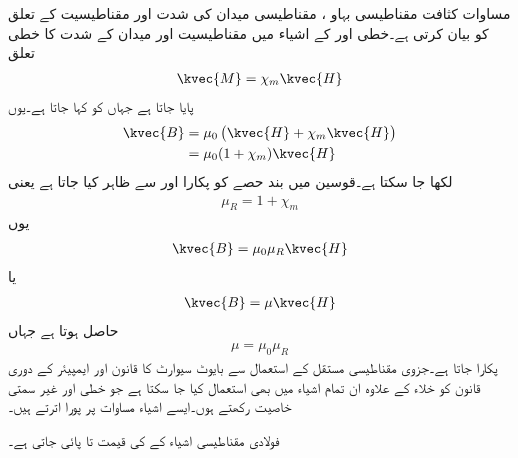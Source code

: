 مساوات  کثافت مقناطیسی  بہاو ، مقناطیسی میدان کی شدت  اور مقناطیسیت  کے تعلق کو بیان کرتی ہے۔خطی اور  کے اشیاء  میں مقناطیسیت اور میدان کے شدت کا خطی تعلق
\begin{align}\label{مساوات_امالہ_خطی_ہم_سمتی_اشیاء_تعلق}
\kvec{M}=\chi_m \kvec{H}
\end{align}
پایا جاتا ہے  جہاں  کو  کہا جاتا ہے۔یوں
\begin{align*}
\kvec{B}&=\mu_0\left(\kvec{H}+\chi_m \kvec{H} \right)\\
&=\mu_0 (1+\chi_m)\kvec{H}
\end{align*}
لکھا جا سکتا ہے۔قوسین میں بند حصے کو  پکارا اور  سے ظاہر کیا جاتا ہے یعنی
\begin{align}
\mu_R=1+\chi_m
\end{align}
یوں
\begin{align*}
\kvec{B}=\mu_0 \mu_R \kvec{H}
\end{align*}
یا
\begin{align}
\kvec{B}=\mu \kvec{H}
\end{align}
حاصل ہوتا ہے جہاں 
\begin{align}
\mu=\mu_0 \mu_R
\end{align}
 پکارا جاتا ہے۔جزوی مقناطیسی مستقل  کے استعمال سے بایوٹ سیوارٹ کا قانون اور ایمپیئر کے دوری قانون کو خلاء کے علاوہ ان تمام اشیاء میں بھی استعمال کیا جا سکتا ہے جو خطی اور غیر سمتی خاصیت رکھتے ہوں۔ایسے اشیاء مساوات  پر پورا اترتے ہیں۔

فولادی مقناطیسی اشیاء کے  کی قیمت  تا  پائی جاتی ہے۔

